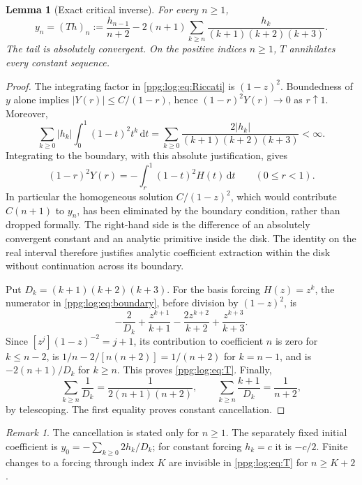 \documentclass[11pt,letterpaper]{article}
\newtheorem{lemma}[theorem]{Lemma}
\theoremstyle{remark}\newtheorem{remark}[theorem]{Remark}
\numberwithin{equation}{section}
\newcommand{\dd}{\mathrm d}
\begin{document}
\begin{lemma}[Exact critical inverse]\label{ppg:log:lem:inverseT}
For every $n\ge1$,
\begin{equation}\label{ppg:log:eq:T}
 y_n=(Th)_n:=\frac{h_{n-1}}{n+2}
       -2(n+1)\sum_{k\ge n}\frac{h_k}{(k+1)(k+2)(k+3)}.
\end{equation}
The tail is absolutely convergent. On the positive indices $n\ge1$, $T$ annihilates every constant sequence.
\end{lemma}
\begin{proof}
The integrating factor in \eqref{ppg:log:eq:Riccati} is $(1-z)^2$. Boundedness of $y$ alone implies $|Y(r)|\le C/(1-r)$, hence $(1-r)^2Y(r)\to0$ as $r\uparrow1$. Moreover,
\begin{equation}\label{ppg:log:eq:absoluteintegral}
 \sum_{k\ge0}|h_k|\int_0^1(1-t)^2t^k\,\dd t
 =\sum_{k\ge0}\frac{2|h_k|}{(k+1)(k+2)(k+3)}<\infty.
\end{equation}
Integrating to the boundary, with this absolute justification, gives
\begin{equation}\label{ppg:log:eq:boundary}
 (1-r)^2Y(r)=-\int_r^1(1-t)^2H(t)\,\dd t\qquad(0\le r<1).
\end{equation}
In particular the homogeneous solution $C/(1-z)^2$, which would contribute $C(n+1)$ to $y_n$, has been eliminated by the boundary condition, rather than dropped formally. The right-hand side is the difference of an absolutely convergent constant and an analytic primitive inside the disk. The identity on the real interval therefore justifies analytic coefficient extraction within the disk without continuation across its boundary.

Put $D_k=(k+1)(k+2)(k+3)$. For the basis forcing $H(z)=z^k$, the numerator in \eqref{ppg:log:eq:boundary}, before division by $(1-z)^2$, is
\[
 -\frac2{D_k}+\frac{z^{k+1}}{k+1}-\frac{2z^{k+2}}{k+2}
                   +\frac{z^{k+3}}{k+3}.
\]
Since $[z^j](1-z)^{-2}=j+1$, its contribution to coefficient $n$ is zero for $k\le n-2$, is
$1/n-2/[n(n+2)]=1/(n+2)$ for $k=n-1$, and is $-2(n+1)/D_k$ for $k\ge n$. This proves \eqref{ppg:log:eq:T}. Finally,
\begin{equation}\label{ppg:log:eq:telescopes}
 \sum_{k\ge n}\frac1{D_k}=\frac1{2(n+1)(n+2)},\qquad
 \sum_{k\ge n}\frac{k+1}{D_k}=\frac1{n+2},
\end{equation}
by telescoping. The first equality proves constant cancellation.
\end{proof}
\begin{remark}
The cancellation is stated only for $n\ge1$. The separately fixed initial coefficient is $y_0=-\sum_{k\ge0}2h_k/D_k$; for constant forcing $h_k=c$ it is $-c/2$. Finite changes to a forcing through index $K$ are invisible in \eqref{ppg:log:eq:T} for $n\ge K+2$.
\end{remark}
\end{document}
